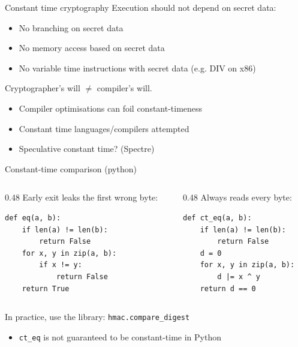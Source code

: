 \begin{frame}{Constant time cryptography}
  \pause
  Execution should not depend on secret data:
  \begin{itemize}[<+(1)->]
    \item No branching on secret data
    \item No memory access based on secret data
    \item No variable time instructions with secret data (e.g. DIV on x86)
  \end{itemize}

  \vspace*{1em}
  
  \pause
  Cryptographer's will $\neq$ compiler's will.
  \begin{itemize}[<+(1)->]
    \item Compiler optimisations can foil constant-timeness
    \item Constant time languages/compilers attempted
    \item Speculative constant time? (Spectre)
  \end{itemize}
\end{frame}

\begin{frame}[fragile]{Constant-time comparison (python)}
  \begin{columns}[T,onlytextwidth]
    \begin{column}{0.48\textwidth}
      Early exit leaks the first wrong byte:
      \begin{lstlisting}[style=py]
def eq(a, b):
    if len(a) != len(b):
        return False
    for x, y in zip(a, b):
        if x != y:
            return False
    return True
      \end{lstlisting}
    \end{column}
    \begin{column}{0.48\textwidth}
      \pause
      Always reads every byte:
      \begin{lstlisting}[style=py]
def ct_eq(a, b):
    if len(a) != len(b):
        return False
    d = 0
    for x, y in zip(a, b):
        d |= x ^ y
    return d == 0
      \end{lstlisting}
    \end{column}
  \end{columns}

  \vspace*{1em}

  \pause
  In practice, use the library: \texttt{hmac.compare\_digest}
  \begin{itemize}[<+(1)->]
    \item \texttt{ct\_eq} is not guaranteed to be constant-time in Python
  \end{itemize}
\end{frame}

